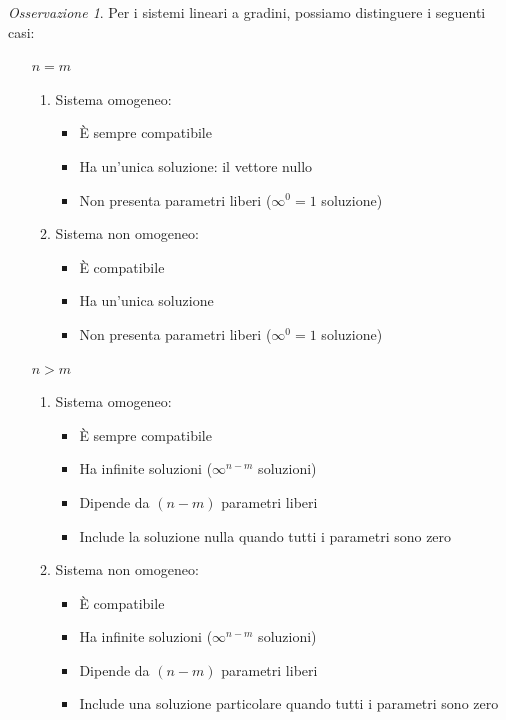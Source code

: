\documentclass{article}
\theoremstyle{plain}
\theoremstyle{definition}
\theoremstyle{remark}
\newtheorem{rem}{Osservazione}
\begin{document}
\vspace{10pt}

\begin{rem}
    Per i sistemi lineari a gradini, possiamo distinguere i seguenti casi:
    \begin{itemize}
        \item[$n = m$]
        \begin{enumerate}
            \item Sistema omogeneo:
            \begin{itemize}
                \item È sempre compatibile
                \item Ha un'unica soluzione: il vettore nullo
                \item Non presenta parametri liberi ($\infty^0 = 1$ soluzione)
            \end{itemize}
            \item Sistema non omogeneo:
            \begin{itemize}
                \item È compatibile
                \item Ha un'unica soluzione
                \item Non presenta parametri liberi ($\infty^0 = 1$ soluzione)
            \end{itemize}
        \end{enumerate}
        \item[$n > m$]
        \begin{enumerate}
            \item Sistema omogeneo:
            \begin{itemize}
                \item È sempre compatibile
                \item Ha infinite soluzioni ($\infty^{n-m}$ soluzioni)
                \item Dipende da $(n-m)$ parametri liberi
                \item Include la soluzione nulla quando tutti i parametri sono zero
            \end{itemize}
            \item Sistema non omogeneo:
            \begin{itemize}
                \item È compatibile
                \item Ha infinite soluzioni ($\infty^{n-m}$ soluzioni)
                \item Dipende da $(n-m)$ parametri liberi
                \item Include una soluzione particolare quando tutti i parametri sono zero
            \end{itemize}
        \end{enumerate}
    \end{itemize}
\end{rem}
\end{document}
